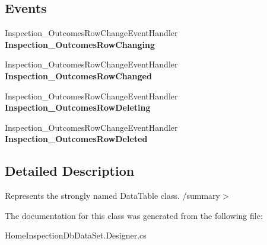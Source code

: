 \subsection*{Events}
\begin{DoxyCompactItemize}
\item 
\mbox{\label{class_a_f_h___scheduler_1_1_home_inspection_db_data_set_1_1_inspection___outcomes_data_table_a0aa5f3019f34ecc86caf96115bf5e2ac}} 
Inspection\+\_\+\+Outcomes\+Row\+Change\+Event\+Handler {\bfseries Inspection\+\_\+\+Outcomes\+Row\+Changing}
\item 
\mbox{\label{class_a_f_h___scheduler_1_1_home_inspection_db_data_set_1_1_inspection___outcomes_data_table_a6190d19c97706759262192fcaf86e5c0}} 
Inspection\+\_\+\+Outcomes\+Row\+Change\+Event\+Handler {\bfseries Inspection\+\_\+\+Outcomes\+Row\+Changed}
\item 
\mbox{\label{class_a_f_h___scheduler_1_1_home_inspection_db_data_set_1_1_inspection___outcomes_data_table_ad88725918329631084f3b99e4b0b4e3e}} 
Inspection\+\_\+\+Outcomes\+Row\+Change\+Event\+Handler {\bfseries Inspection\+\_\+\+Outcomes\+Row\+Deleting}
\item 
\mbox{\label{class_a_f_h___scheduler_1_1_home_inspection_db_data_set_1_1_inspection___outcomes_data_table_ab64d5ea5450da77b76c10fea1c43bb14}} 
Inspection\+\_\+\+Outcomes\+Row\+Change\+Event\+Handler {\bfseries Inspection\+\_\+\+Outcomes\+Row\+Deleted}
\end{DoxyCompactItemize}


\subsection{Detailed Description}
Represents the strongly named Data\+Table class. /summary$>$ 

The documentation for this class was generated from the following file\+:\begin{DoxyCompactItemize}
\item 
Home\+Inspection\+Db\+Data\+Set.\+Designer.\+cs\end{DoxyCompactItemize}
